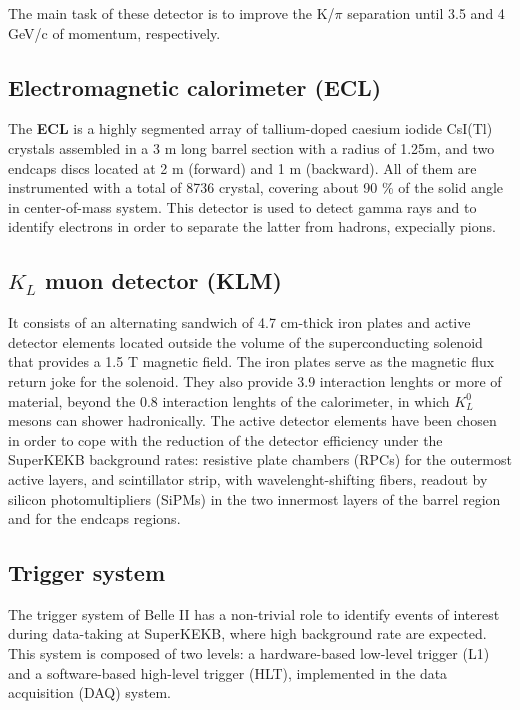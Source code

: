 The main task of these detector is to improve the K/$\pi$ separation until 3.5 and 4 GeV/c of momentum, respectively.

\subsection{Electromagnetic calorimeter (ECL)}

The \textbf{ECL} is a highly segmented array of tallium-doped caesium iodide CsI(Tl) crystals assembled in a 3 m long barrel section with a radius of 1.25m, and two endcaps discs located at 2 m (forward) and 1 m (backward). All of them are instrumented with a total of 8736 crystal, covering about 90 \% of the solid angle in center-of-mass system. This detector is used to detect gamma rays and to identify electrons in order to separate the latter from hadrons, expecially pions.

\subsection{$K_{L}$ muon detector (KLM)}

It consists of an alternating sandwich of 4.7 cm-thick iron plates and active detector elements located outside the volume of the superconducting solenoid that provides a 1.5 T magnetic field. The iron plates serve as the magnetic flux return joke for the solenoid. They also provide 3.9 interaction lenghts or more of material, beyond the 0.8 interaction lenghts of the calorimeter, in which $K_{L}^{0}$ mesons can shower hadronically. The active detector elements have been chosen in order to cope with the reduction of the detector efficiency under the SuperKEKB background rates: resistive plate chambers (RPCs) for the outermost active layers, and scintillator strip, with wavelenght-shifting fibers, readout by silicon photomultipliers (SiPMs) in the two innermost layers of the barrel region and for the endcaps regions.

\subsection{Trigger system}

The trigger system of Belle II has a non-trivial role to identify events of interest during data-taking at SuperKEKB, where high background rate are expected. 
This system is composed of two levels: a hardware-based low-level trigger (L1) and a software-based high-level trigger (HLT), implemented in the data acquisition (DAQ) system. 

